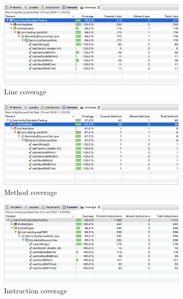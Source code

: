 \documentclass{article}
\begin{document}
    \begin{figure}[h!]
		\centering
		\begin{subfigure}[b]{0.4\linewidth}
			\includegraphics[width=\linewidth]{coverage/line_coverage.png}
			\caption{Line coverage}
		\end{subfigure}
		\begin{subfigure}[b]{0.4\linewidth}
			\includegraphics[width=\linewidth]{coverage/method_coverage.png}
			\caption{Method coverage}
        \end{subfigure}
        \begin{subfigure}[b]{0.4\linewidth}
			\includegraphics[width=\linewidth]{coverage/instruction_coverage.png}
			\caption{Instruction coverage}
        \end{subfigure}
        \begin{subfigure}[b]{0.4\linewidth}

\end{subfigure}
\end{figure}
\end{document}
